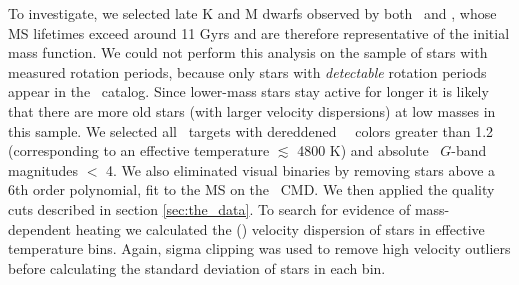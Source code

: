 To investigate, we selected late K and M dwarfs observed by both \kepler\ and
\gaia, whose MS lifetimes exceed around 11 Gyrs and are therefore
representative of the initial mass function.
We could not perform this analysis on the sample of stars with measured
rotation periods, because only stars with {\it detectable} rotation periods
appear in the \mct\ catalog.
Since lower-mass stars stay active for longer it is likely that there are more
old stars (with larger velocity dispersions) at low masses in this sample.
We selected all \kepler\ targets with dereddened \gaia\ \gcolor\ colors
greater than 1.2 (corresponding to an effective temperature $\lesssim$
4800 K) and absolute \gaia\ $G$-band magnitudes $<$ 4.
We also eliminated visual binaries by removing stars above a 6th order
polynomial, fit to the MS on the \gaia\ CMD.
We then applied the quality cuts described in section \ref{sec:the_data}.
To search for evidence of mass-dependent heating we calculated the (\vb)
velocity dispersion of stars in effective temperature bins.
Again, sigma clipping was used to remove high velocity outliers before
calculating the standard deviation of stars in each bin.

